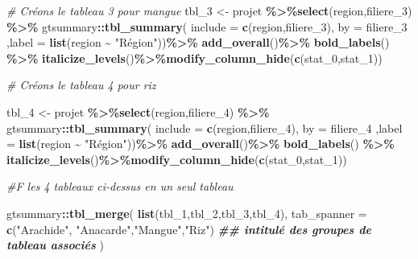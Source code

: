 \documentclass[
]{article}
\newenvironment{Shaded}{\begin{snugshade}}{\end{snugshade}}
\newcommand{\AttributeTok}[1]{\textcolor[rgb]{0.13,0.29,0.53}{#1}}
\newcommand{\CommentTok}[1]{\textcolor[rgb]{0.56,0.35,0.01}{\textit{#1}}}
\newcommand{\DocumentationTok}[1]{\textcolor[rgb]{0.56,0.35,0.01}{\textbf{\textit{#1}}}}
\newcommand{\FunctionTok}[1]{\textcolor[rgb]{0.13,0.29,0.53}{\textbf{#1}}}
\newcommand{\NormalTok}[1]{#1}
\newcommand{\OtherTok}[1]{\textcolor[rgb]{0.56,0.35,0.01}{#1}}
\newcommand{\SpecialCharTok}[1]{\textcolor[rgb]{0.81,0.36,0.00}{\textbf{#1}}}
\newcommand{\StringTok}[1]{\textcolor[rgb]{0.31,0.60,0.02}{#1}}
\begin{document}
\begin{Shaded}
\begin{Highlighting}[]
               \CommentTok{\# Créons le tableau 3 pour mangue}
\NormalTok{tbl\_3 }\OtherTok{\textless{}{-}}\NormalTok{ projet }\SpecialCharTok{\%\textgreater{}\%}\FunctionTok{select}\NormalTok{(region,filiere\_3) }\SpecialCharTok{\%\textgreater{}\%}
\NormalTok{  gtsummary}\SpecialCharTok{::}\FunctionTok{tbl\_summary}\NormalTok{(}
    \AttributeTok{include =} \FunctionTok{c}\NormalTok{(region,filiere\_3),}
    \AttributeTok{by =}\NormalTok{ filiere\_3}
\NormalTok{  ,}\AttributeTok{label =} \FunctionTok{list}\NormalTok{(region }\SpecialCharTok{\textasciitilde{}} \StringTok{"Région"}\NormalTok{))}\SpecialCharTok{\%\textgreater{}\%}
  \FunctionTok{add\_overall}\NormalTok{()}\SpecialCharTok{\%\textgreater{}\%}
  \FunctionTok{bold\_labels}\NormalTok{() }\SpecialCharTok{\%\textgreater{}\%}
  \FunctionTok{italicize\_levels}\NormalTok{()}\SpecialCharTok{\%\textgreater{}\%}\FunctionTok{modify\_column\_hide}\NormalTok{(}\FunctionTok{c}\NormalTok{(stat\_0,stat\_1))}

               \CommentTok{\# Créons le tableau 4 pour riz}

\NormalTok{tbl\_4 }\OtherTok{\textless{}{-}}\NormalTok{ projet }\SpecialCharTok{\%\textgreater{}\%}\FunctionTok{select}\NormalTok{(region,filiere\_4) }\SpecialCharTok{\%\textgreater{}\%}
\NormalTok{  gtsummary}\SpecialCharTok{::}\FunctionTok{tbl\_summary}\NormalTok{(}
    \AttributeTok{include =} \FunctionTok{c}\NormalTok{(region,filiere\_4),}
    \AttributeTok{by =}\NormalTok{ filiere\_4}
\NormalTok{  ,}\AttributeTok{label =} \FunctionTok{list}\NormalTok{(region }\SpecialCharTok{\textasciitilde{}} \StringTok{"Région"}\NormalTok{))}\SpecialCharTok{\%\textgreater{}\%}
  \FunctionTok{add\_overall}\NormalTok{()}\SpecialCharTok{\%\textgreater{}\%}
  \FunctionTok{bold\_labels}\NormalTok{() }\SpecialCharTok{\%\textgreater{}\%}
  \FunctionTok{italicize\_levels}\NormalTok{()}\SpecialCharTok{\%\textgreater{}\%}\FunctionTok{modify\_column\_hide}\NormalTok{(}\FunctionTok{c}\NormalTok{(stat\_0,stat\_1))}

               \CommentTok{\#F les 4 tableaux ci{-}dessus en un seul tableau}

\NormalTok{gtsummary}\SpecialCharTok{::}\FunctionTok{tbl\_merge}\NormalTok{(}
  \FunctionTok{list}\NormalTok{(tbl\_1,tbl\_2,tbl\_3,tbl\_4),}
  \AttributeTok{tab\_spanner =}  \FunctionTok{c}\NormalTok{(}\StringTok{"Arachide"}\NormalTok{, }\StringTok{"Anacarde"}\NormalTok{,}\StringTok{"Mangue"}\NormalTok{,}\StringTok{"Riz"}\NormalTok{) }
  \DocumentationTok{\#\# intitulé des groupes de tableau associés}
\NormalTok{)}
\end{Highlighting}
\end{Shaded}
\end{document}
